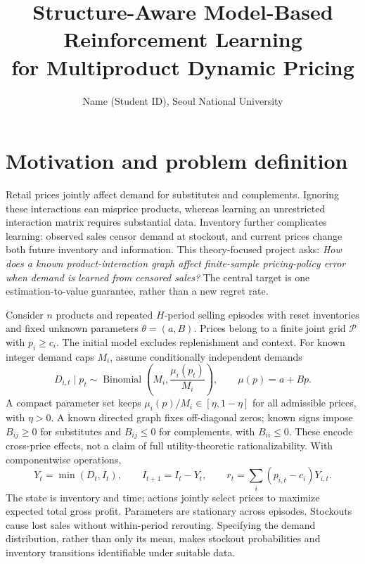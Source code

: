 \documentclass[10pt]{article}
\title{Structure-Aware Model-Based Reinforcement Learning\\for Multiproduct Dynamic Pricing}
\author{Name (Student ID), Seoul National University}
\date{}
\begin{document}
\maketitle
\vspace{-1.5em}

\section{Motivation and problem definition}
Retail prices jointly affect demand for substitutes and complements. Ignoring these interactions can misprice products, whereas learning an unrestricted interaction matrix requires substantial data. Inventory further complicates learning: observed sales censor demand at stockout, and current prices change both future inventory and information. This theory-focused project asks: \emph{How does a known product-interaction graph affect finite-sample pricing-policy error when demand is learned from censored sales?} The central target is one estimation-to-value guarantee, rather than a new regret rate.

Consider $n$ products and repeated $H$-period selling episodes with reset inventories and fixed unknown parameters $\theta=(a,B)$. Prices belong to a finite joint grid $\mathcal P$ with $p_i\ge c_i$. The initial model excludes replenishment and context. For known integer demand caps $M_i$, assume conditionally independent demands
\begin{equation}
 D_{i,t}\mid p_t\sim\operatorname{Binomial}\!\left(M_i,\frac{\mu_i(p_t)}{M_i}\right),
 \qquad \mu(p)=a+Bp.
\end{equation}
A compact parameter set keeps $\mu_i(p)/M_i\in[\eta,1-\eta]$ for all admissible prices, with $\eta>0$. A known directed graph fixes off-diagonal zeros; known signs impose $B_{ij}\ge0$ for substitutes and $B_{ij}\le0$ for complements, with $B_{ii}\le0$. These encode cross-price effects, not a claim of full utility-theoretic rationalizability. With componentwise operations,
\begin{equation}
 Y_t=\min(D_t,I_t),\qquad I_{t+1}=I_t-Y_t,\qquad
 r_t=\sum_i(p_{i,t}-c_i)Y_{i,t}.
\end{equation}
The state is inventory and time; actions jointly select prices to maximize expected total gross profit. Parameters are stationary across episodes. Stockouts cause lost sales without within-period rerouting. Specifying the demand distribution, rather than only its mean, makes stockout probabilities and inventory transitions identifiable under suitable data.
\end{document}
